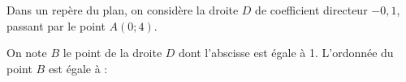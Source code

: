 
Dans un repère du plan, on considère la droite $D$ de coefficient directeur $-0,1$, passant par le point $A(0 ; 4)$.

On note $B$ le point de la droite $D$ dont l'abscisse est égale à 1. L'ordonnée du point $B$ est égale à :

\smallskip


